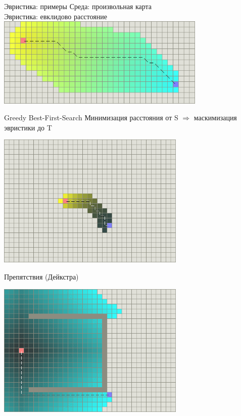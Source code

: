 \documentclass[10pt]{beamer}
\begin{document}
\begin{frame}[fragile]{Эвристика: примеры}
Среда: произвольная карта\\
Эвристика: евклидово расстояние
\includegraphics[width=10cm]{Term_2/Source/images/euclidean.png}
\end{frame}

\begin{frame}[fragile]{Greedy Best-First-Search}
Минимизация расстояния от S $\Rightarrow$ маскимизация эвристики до T
\begin{center}
\includegraphics[width=9cm]{Term_2/Source/images/best-first-search.png}
\end{center}
\end{frame}

\begin{frame}[fragile]{Препятствия (Дейкстра)}
\begin{center}
\includegraphics[width=9cm]{Term_2/Source/images/dijkstra-trap.png}
\end{center}
\end{frame}
\end{document}
